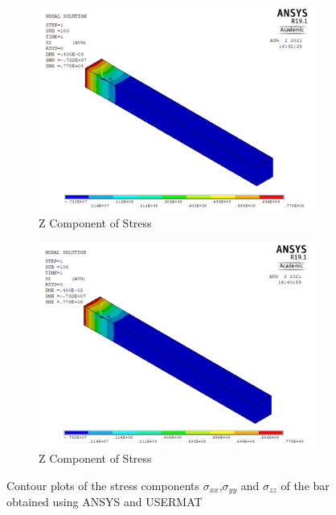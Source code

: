\documentclass[a4paper,12pt]{extarticle}
\begin{document}
\begin{figure}[htbp]\ContinuedFloat     
     \begin{subfigure}[b]{0.4\textwidth}
         \centering
         \includegraphics[width=1.1\textwidth]{17.Ansys_SZ.png}
         \caption{Z Component of Stress}
         \label{fig:Z Component of Stress}
     \end{subfigure}
     \hfill
     \begin{subfigure}[b]{0.4\textwidth}
         \centering
         \includegraphics[width=1.1\textwidth]{20.User_SZ.png}
         \caption{Z Component of Stress}
         \label{fig:Z Component of Stress2}
     \end{subfigure}
        \caption{Contour plots of the stress components $\sigma_{xx}$,$\sigma_{yy}$ and $\sigma_{zz}$ of the bar obtained using ANSYS and USERMAT}
        \label{fig:USERMAT}     
\end{figure}
\end{document}
